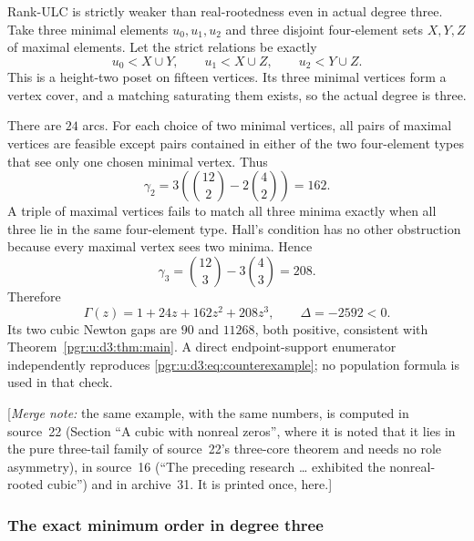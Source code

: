 \documentclass[11pt]{article}
\numberwithin{equation}{section}
\theoremstyle{definition}\newtheorem{definition}[theorem]{Definition}\newtheorem{remark}[theorem]{Remark}
\newcommand{\Ga}{\Gamma}                   %
\newcommand{\mnote}[1]{[\textit{Merge note:} #1]}
\begin{document}
Rank-ULC is strictly weaker than real-rootedness even in actual degree three. Take three minimal elements $u_0,u_1,u_2$ and three disjoint four-element sets $X,Y,Z$ of maximal elements. Let the strict relations be exactly
\[
 u_0<X\cup Y,\qquad u_1<X\cup Z,\qquad u_2<Y\cup Z.
\]
This is a height-two poset on fifteen vertices. Its three minimal vertices form a vertex cover, and a matching saturating them exists, so the actual degree is three.

There are $24$ arcs. For each choice of two minimal vertices, all pairs of maximal vertices are feasible except pairs contained in either of the two four-element types that see only one chosen minimal vertex. Thus
\[
 \gamma_2=3\left(\binom{12}{2}-2\binom42\right)=162.
\]
A triple of maximal vertices fails to match all three minima exactly when all three lie in the same four-element type. Hall's condition has no other obstruction because every maximal vertex sees two minima. Hence
\[
 \gamma_3=\binom{12}{3}-3\binom43=208.
\]
Therefore
\begin{equation}\label{pgr:u:d3:eq:counterexample}
 \Ga(z)=1+24z+162z^2+208z^3,\qquad \Delta=-2592<0.
\end{equation}
Its two cubic Newton gaps are $90$ and $11268$, both positive, consistent with Theorem~\ref{pgr:u:d3:thm:main}. A direct endpoint-support enumerator independently reproduces \eqref{pgr:u:d3:eq:counterexample}; no population formula is used in that check.

\mnote{the same example, with the same numbers, is computed in source~22
(Section ``A cubic with nonreal zeros'', where it is noted that it lies in
the pure three-tail family of source~22's three-core theorem and needs no
role asymmetry), in source~16 (``The preceding research \dots{} exhibited
the nonreal-rooted cubic'') and in archive~31. It is printed once, here.}


\subsubsection{The exact minimum order in degree three}
\end{document}
